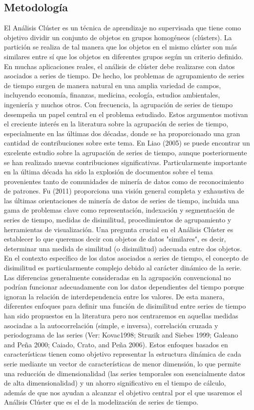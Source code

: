 \documentclass[10pt,a4paper]{article}
\begin{document}
\subsection{Metodología}
El Análisis Clúster es un técnica de aprendizaje no supervisada que tiene como objetivo dividir un conjunto de objetos en grupos homogéneos (clústers). La partición se realiza de tal manera que los objetos en el mismo clúster son más similares entre sí que los objetos en diferentes grupos según un criterio definido. En muchas aplicaciones reales, el análisis de clúster debe realizarse con datos asociados a  series de tiempo. De hecho, los problemas de agrupamiento de series de tiempo surgen de manera natural en una amplia variedad de campos, incluyendo economía, finanzas, medicina, ecología, estudios ambientales, ingeniería y muchos otros. 
Con frecuencia, la agrupación de series de tiempo desempeña un papel central en el problema estudiado. Estos argumentos motivan el creciente interés en la literatura sobre la agrupación de series de tiempo, especialmente en las últimas dos décadas, donde se ha proporcionado una gran cantidad de contribuciones sobre este tema. En Liao (2005) se puede encontrar un excelente estudio sobre la agrupación de series de tiempo, aunque posteriormente se han realizado nuevas contribuciones significativas. Particularmente importante en la última década ha sido la explosión de documentos sobre el tema provenientes tanto de comunidades de minería de datos como de reconocimiento de patrones. Fu (2011) proporciona una visión general completa y exhaustiva de las últimas orientaciones de minería de datos de series de tiempo, incluida una gama de problemas clave como representación, indexación y segmentación de series de tiempo, medidas de disimilitud, procedimientos de agrupamiento y herramientas de visualización.
Una pregunta crucial en el Análisis Clúster es establecer lo que queremos decir con objetos de datos "similares", es decir, determinar una medida de similitud (o disimilitud) adecuada entre dos objetos. En el contexto específico de los datos asociados a series de tiempo, el concepto de disimilitud es particularmente complejo debido al carácter dinámico de la serie. Las diferencias generalmente consideradas en la agrupación convencional no podrían funcionar adecuadamente con los datos dependientes del tiempo porque ignoran la relación de interdependencia entre los valores. 
De esta manera, diferentes enfoques para definir una función de disimilitud entre series de tiempo han sido propuestos en la literatura pero nos centraremos en aquellas medidas asociadas a la autocorrelación (simple, e inversa), correlación cruzada y periodograma de las series (Ver: Kovac1998; Struzik and Siebes 1999; Galeano and Peña 2000; Caiado, Crato, and Peña 2006). Estos enfoques basados en características tienen como objetivo representar la estructura dinámica de cada serie mediante un vector de características de menor dimensión, lo que permite una reducción de dimensionalidad (las series temporales son esencialmente datos de alta dimensionalidad) y un ahorro significativo en el tiempo de cálculo, además de que nos ayudan a alcanzar el objetivo central por el que usaremos el Análisis Clúster que es el de la modelización de series de tiempo.
\end{document}
